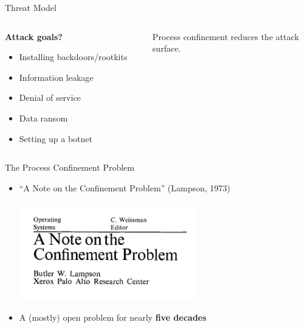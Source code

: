 \documentclass[12pt, dvipsnames, aspectratio=169]{beamer}
\begin{document}
\begin{frame}[c]{Threat Model}
\begin{columns}
    \begin{column}{0.4\textwidth}
        \textbf{Attack goals?}
        \begin{itemize}
            \item Installing backdoors/rootkits
            \item Information leakage
            \item Denial of service
            \item Data ransom
            \item Setting up a botnet
        \end{itemize}
    \end{column}
    \begin{column}{0.6\textwidth}
        \begin{center}
            \Huge
            Process confinement reduces the attack\\surface.
        \end{center}
    \end{column}
\end{columns}
\end{frame}

\begin{frame}[c]{The Process Confinement Problem}
    \begin{itemize}
        \item \enquote{A Note on the Confinement Problem} (Lampson, 1973)
        \begin{center}
            \includegraphics[width=0.6\textwidth]{figs/lampson/1.png}
        \end{center}
        \item A (mostly) open problem for nearly \textbf{five decades}
    \end{itemize}
\end{frame}

\end{document}
